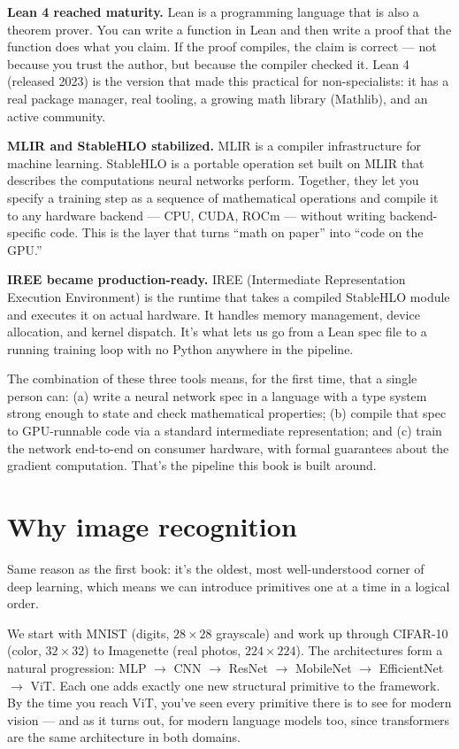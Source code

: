 \textbf{Lean 4 reached maturity.} Lean is a programming language that is
also a theorem prover. You can write a function in Lean and then write
a proof that the function does what you claim. If the proof compiles,
the claim is correct --- not because you trust the author, but because
the compiler checked it. Lean 4 (released 2023) is the version that
made this practical for non-specialists: it has a real package manager,
real tooling, a growing math library (Mathlib), and an active community.

\textbf{MLIR and StableHLO stabilized.} MLIR is a compiler infrastructure
for machine learning. StableHLO is a portable operation set built on
MLIR that describes the computations neural networks perform. Together,
they let you specify a training step as a sequence of mathematical
operations and compile it to any hardware backend --- CPU, CUDA, ROCm ---
without writing backend-specific code. This is the layer that turns
``math on paper'' into ``code on the GPU.''

\textbf{IREE became production-ready.} IREE (Intermediate Representation
Execution Environment) is the runtime that takes a compiled StableHLO
module and executes it on actual hardware. It handles memory management,
device allocation, and kernel dispatch. It's what lets us go from a
Lean spec file to a running training loop with no Python anywhere in
the pipeline.

The combination of these three tools means, for the first time, that
a single person can: (a) write a neural network spec in a language
with a type system strong enough to state and check mathematical
properties; (b) compile that spec to GPU-runnable code via a standard
intermediate representation; and (c) train the network end-to-end on
consumer hardware, with formal guarantees about the gradient
computation. That's the pipeline this book is built around.

\section*{Why image recognition}

Same reason as the first book: it's the oldest, most well-understood
corner of deep learning, which means we can introduce primitives one
at a time in a logical order.

We start with MNIST (digits, $28 \times 28$ grayscale) and work up through
CIFAR-10 (color, $32 \times 32$) to Imagenette (real photos, $224 \times 224$).
The architectures form a natural progression:
MLP $\to$ CNN $\to$ ResNet $\to$ MobileNet $\to$ EfficientNet $\to$ ViT.
Each one adds exactly one new structural primitive to the framework. By
the time you reach ViT, you've seen every primitive there is to see for
modern vision --- and as it turns out, for modern language models too,
since transformers are the same architecture in both domains.

